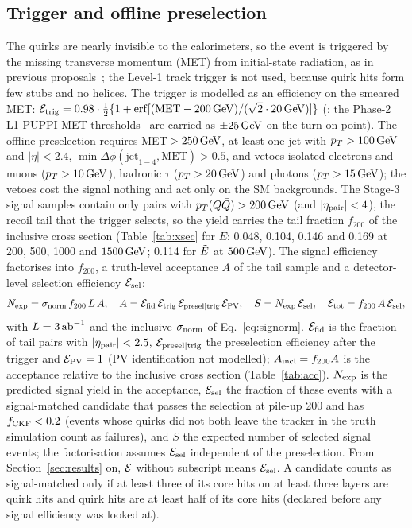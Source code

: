 \subsection{Trigger and offline preselection}\label{sec:strategy:trig}
The quirks are nearly invisible to the calorimeters, so the event is triggered by the missing transverse momentum (MET)
from initial-state radiation, as in previous proposals~\cite{Knapen:2017kly,Li:2019wce}; the Level-1 track trigger is
not used, because quirk hits form few stubs and no helices. The trigger is modelled as an efficiency on the smeared
MET: $\mathcal{E}_{\rm trig}=0.98\cdot\frac12\{1+\operatorname{erf}[(\mathrm{MET}-200\,\mathrm{GeV})/(\sqrt2\cdot20\,\mathrm{GeV})]\}$ (\EST{};
the Phase-2 L1 PUPPI-MET thresholds~\cite{Zabi:2020gjd} are carried as $\pm25\,\mathrm{GeV}$ on the turn-on point). The offline
preselection requires MET$\,>250\,\mathrm{GeV}$, at least one jet with $p_T>100\,\mathrm{GeV}$ and $|\eta|<2.4$, $\min\Delta\phi(\text{jet}_{1-4},
\text{MET})>0.5$, and vetoes isolated electrons and muons ($p_T>10\,\mathrm{GeV}$), hadronic $\tau$ ($p_T>20\,\mathrm{GeV}$) and photons
($p_T>15\,\mathrm{GeV}$); the vetoes cost the signal nothing and act only on the SM backgrounds. The Stage-3 signal samples
contain only pairs with $p_T(Q\bar Q)>200\,\mathrm{GeV}$ (and $|\eta_{\rm pair}|<4$), the recoil tail that the trigger selects, so
the yield carries the tail fraction $f_{200}$ of the inclusive cross section (Table~\ref{tab:xsec} for $E$: 0.048, 0.104, 0.146
and 0.169 at 200, 500, 1000 and $1500\,\mathrm{GeV}$; 0.114 for $\tilde{E}$ at $500\,\mathrm{GeV}$). The signal efficiency factorises into
$f_{200}$, a truth-level acceptance $A$ of the tail sample and a detector-level selection efficiency $\mathcal{E}_{\rm sel}$:
\begin{equation}
  N_{\rm exp}=\sigma_{\rm norm}\,f_{200}\,L\,A,\quad A=\mathcal{E}_{\rm fid}\,\mathcal{E}_{\rm trig}\,\mathcal{E}_{\rm presel|trig}\,\mathcal{E}_{\rm PV},
  \quad S=N_{\rm exp}\,\mathcal{E}_{\rm sel},\quad \mathcal{E}_{\rm tot}=f_{200}\,A\,\mathcal{E}_{\rm sel},
  \label{eq:effchain}
\end{equation}
with $L=3\,\mathrm{ab}^{-1}$ and the inclusive $\sigma_{\rm norm}$ of Eq.~\eqref{eq:signorm}. $\mathcal{E}_{\rm fid}$ is the fraction of tail
pairs with $|\eta_{\rm pair}|<2.5$, $\mathcal{E}_{\rm presel|trig}$ the preselection efficiency after the trigger and
$\mathcal{E}_{\rm PV}=1$ (PV identification not modelled); $A_{\rm incl}=f_{200}A$ is the acceptance relative to the inclusive
cross section (Table~\ref{tab:acc}). $N_{\rm exp}$ is the predicted signal yield in the acceptance, $\mathcal{E}_{\rm sel}$ the
fraction of these events with a signal-matched candidate that passes the selection at pile-up 200 and has
$f_{\rm CKF}<0.2$ (events whose quirks did not both leave the tracker in the truth simulation count as failures), and $S$
the expected number of selected signal events; the factorisation assumes $\mathcal{E}_{\rm sel}$ independent of the
preselection. From Section~\ref{sec:results} on, $\mathcal{E}$ without subscript means $\mathcal{E}_{\rm sel}$. A candidate counts as signal-matched only if at least three of its core hits on at least three layers
are quirk hits and quirk hits are at least half of its core hits (declared before any signal efficiency was looked at).

